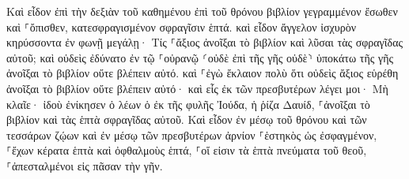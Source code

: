 \documentclass{openreader}
\begin{document}
Καὶ εἶδον ἐπὶ τὴν δεξιὰν τοῦ καθημένου ἐπὶ τοῦ θρόνου βιβλίον γεγραμμένον ἔσωθεν καὶ ⸀ὄπισθεν, κατεσφραγισμένον σφραγῖσιν ἑπτά. 
καὶ εἶδον ἄγγελον ἰσχυρὸν κηρύσσοντα ἐν φωνῇ μεγάλῃ· Τίς ⸀ἄξιος ἀνοῖξαι τὸ βιβλίον καὶ λῦσαι τὰς σφραγῖδας αὐτοῦ; 
καὶ οὐδεὶς ἐδύνατο ἐν τῷ ⸀οὐρανῷ ⸂οὐδὲ ἐπὶ τῆς γῆς οὐδὲ⸃ ὑποκάτω τῆς γῆς ἀνοῖξαι τὸ βιβλίον οὔτε βλέπειν αὐτό. 
καὶ ⸀ἐγὼ ἔκλαιον πολὺ ὅτι οὐδεὶς ἄξιος εὑρέθη ἀνοῖξαι τὸ βιβλίον οὔτε βλέπειν αὐτό· 
καὶ εἷς ἐκ τῶν πρεσβυτέρων λέγει μοι· Μὴ κλαῖε· ἰδοὺ ἐνίκησεν ὁ λέων ὁ ἐκ τῆς φυλῆς Ἰούδα, ἡ ῥίζα Δαυίδ, ⸀ἀνοῖξαι τὸ βιβλίον καὶ τὰς ἑπτὰ σφραγῖδας αὐτοῦ. 
Καὶ εἶδον ἐν μέσῳ τοῦ θρόνου καὶ τῶν τεσσάρων ζῴων καὶ ἐν μέσῳ τῶν πρεσβυτέρων ἀρνίον ⸀ἑστηκὸς ὡς ἐσφαγμένον, ⸀ἔχων κέρατα ἑπτὰ καὶ ὀφθαλμοὺς ἑπτά, ⸀οἵ εἰσιν τὰ ἑπτὰ πνεύματα τοῦ θεοῦ, ⸀ἀπεσταλμένοι εἰς πᾶσαν τὴν γῆν. 
\end{document}
